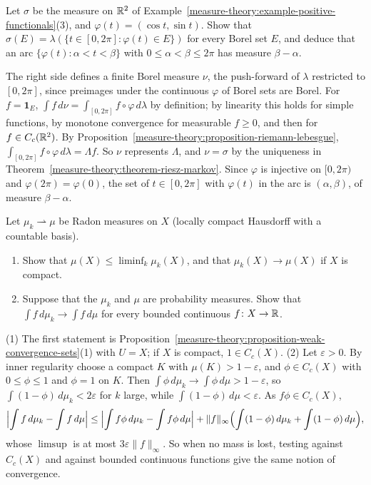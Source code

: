 \begin{exercise}\label{measure-theory:exercise-riesz-circle}
Let $\sigma$ be the measure on $\mathbb{R}^2$ of Example~\ref{measure-theory:example-positive-functionals}(3), and $\varphi(t) = (\cos t, \sin t)$. Show that $\sigma(E) = \lambda(\{t \in [0, 2\pi] : \varphi(t) \in E\})$
for every Borel set $E$, and deduce that an arc $\{\varphi(t) : \alpha < t < \beta\}$ with $0 \leq \alpha < \beta \leq 2\pi$ has measure $\beta - \alpha$.
\end{exercise}

\begin{solution}
The right side defines a finite Borel measure $\nu$, the push-forward of $\lambda$ restricted to $[0, 2\pi]$, since preimages under the continuous $\varphi$ of Borel sets are Borel. For $f = \mathbf{1}_E$,
$\int f\,d\nu = \int_{[0, 2\pi]}f \circ \varphi\,d\lambda$ by definition; by linearity this holds for simple functions, by monotone convergence for measurable $f \geq 0$, and then for $f \in C_c(\mathbb{R}^2)$. By
Proposition~\ref{measure-theory:proposition-riemann-lebesgue}, $\int_{[0, 2\pi]}f \circ \varphi\,d\lambda = \Lambda f$. So $\nu$ represents $\Lambda$, and $\nu = \sigma$ by the uniqueness in
Theorem~\ref{measure-theory:theorem-riesz-markov}. Since $\varphi$ is injective on $[0, 2\pi)$ and $\varphi(2\pi) = \varphi(0)$, the set of $t \in [0, 2\pi]$ with $\varphi(t)$ in the arc is $(\alpha, \beta)$, of
measure $\beta - \alpha$.
\end{solution}

\begin{exercise}\label{measure-theory:exercise-weak-mass}
Let $\mu_k \rightharpoonup \mu$ be Radon measures on $X$ (locally compact Hausdorff with a countable basis).
\begin{enumerate}
\item Show that $\mu(X) \leq \liminf_k\mu_k(X)$, and that $\mu_k(X) \to \mu(X)$ if $X$ is compact.
\item Suppose that the $\mu_k$ and $\mu$ are probability measures. Show that $\int f\,d\mu_k \to \int f\,d\mu$ for every bounded continuous $f \colon X \to \mathbb{R}$.
\end{enumerate}
\end{exercise}

\begin{solution}
(1) The first statement is Proposition~\ref{measure-theory:proposition-weak-convergence-sets}(1) with $U = X$; if $X$ is compact, $1 \in C_c(X)$. (2) Let $\varepsilon > 0$. By inner regularity choose a
compact $K$ with $\mu(K) > 1 - \varepsilon$, and $\phi \in C_c(X)$ with $0 \leq \phi \leq 1$ and $\phi = 1$ on $K$. Then $\int\phi\,d\mu_k \to \int\phi\,d\mu > 1 - \varepsilon$, so
$\int(1 - \phi)\,d\mu_k < 2\varepsilon$ for $k$ large, while $\int(1 - \phi)\,d\mu < \varepsilon$. As $f\phi \in C_c(X)$,
\[
\Bigl|\int f\,d\mu_k - \int f\,d\mu\Bigr| \leq \Bigl|\int f\phi\,d\mu_k - \int f\phi\,d\mu\Bigr| + \|f\|_\infty\Bigl(\int(1 - \phi)\,d\mu_k + \int(1 - \phi)\,d\mu\Bigr),
\]
whose $\limsup$ is at most $3\varepsilon\|f\|_\infty$. So when no mass is lost, testing against $C_c(X)$ and against bounded continuous functions give the same notion of convergence.
\end{solution}

